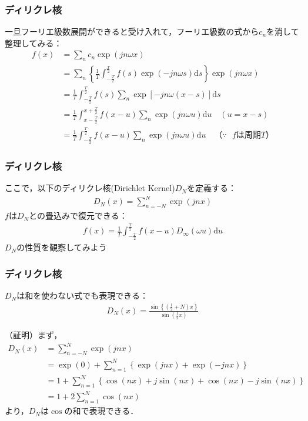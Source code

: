 \documentclass[dvipdfmx,graphicx,14pt]{beamer}
\begin{document}
\begin{frame}[c]
    \frametitle{ディリクレ核}
    一旦フーリエ級数展開ができると受け入れて，フーリエ級数の式から$c_{n}$を消して整理してみる：
    \footnotesize
    \begin{align*}
        f(x) &= \sum_{n} c_{n} \exp(jn\omega x) \\
         &= \sum_{n} \left\{ \frac{1}{T} \int_{-\frac{T}{2}}^{\frac{T}{2}} f(s) \exp(-jn\omega s) \mathrm{d} s \right\} \exp(jn\omega x) \\
         &= \frac{1}{T} \int_{-\frac{T}{2}}^{\frac{T}{2}} f(s) \sum_{n} \exp[-jn\omega(x-s)] \mathrm{d} s \\
         &= \frac{1}{T} \int_{x-\frac{T}{2}}^{x+\frac{T}{2}} f(x-u) \sum_{n} \exp(jn\omega u) \mathrm{d} u  \quad (u = x - s) \\
         &= \frac{1}{T} \int_{-\frac{T}{2}}^{\frac{T}{2}} f(x-u) \sum_{n} \exp(jn\omega u) \mathrm{d} u \quad \text{（$\because$ $f$は周期$T$）}
    \end{align*}
\end{frame}

\begin{frame}[c]
    \frametitle{ディリクレ核}
    ここで，以下のディリクレ核(Dirichlet Kernel)$D_{N}$を定義する：
    \begin{align}
        D_{N}(x) = \sum_{n=-N}^{N} \exp(jnx)
    \end{align}
    $f$は$D_{N}$との畳込みで復元できる：
    \begin{align*}
        f(x) = \frac{1}{T} \int_{-\frac{T}{2}}^{\frac{T}{2}} f(x-u) D_{\infty}(\omega u) \mathrm{d} u
    \end{align*}
    $D_{N}$の性質を観察してみよう
\end{frame}

\begin{frame}[c]
    \frametitle{ディリクレ核}
    \begin{block}{}
        $D_{N}$は和を使わない式でも表現できる：
        \begin{align}
            D_{N}(x) = \frac{\sin\left\{\left(\frac{1}{2} + N\right)x\right\}}{\sin\left(\frac{1}{2}x\right)} \label{eq:dirichlet_kernel_sin}
        \end{align}
    \end{block}
    \scriptsize
    （証明）まず，
    \begin{align}
        D_{N}(x) &= \sum_{n=-N}^{N} \exp(jnx) \nonumber \\
        &= \exp(0) + \sum_{n=1}^{N} \left\{ \exp(jnx) + \exp(-jnx) \right\} \nonumber \\
        &= 1 + \sum_{n = 1}^{N} \left\{ \cos(nx) + j\sin(nx) + \cos(nx) - j\sin(nx)\right\} \nonumber \\
        &= 1 + 2 \sum_{n = 1}^{N} \cos(nx) \label{eq:dirichlet_kernel_cos}
    \end{align}
    より，$D_{N}$は$\cos$の和で表現できる．
\end{frame}
\end{document}
